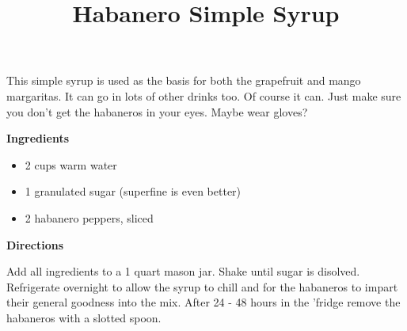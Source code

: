 \documentclass{article}
\title{Habanero Simple Syrup}
\begin{document}
This simple syrup is used as the basis for both the grapefruit and mango margaritas. It can go in
lots of other drinks too. Of course it can. Just make sure you don't get the habaneros in your
eyes. Maybe wear gloves?

\textbf{Ingredients}

\begin{itemize}
      \item 2 cups warm water
      \item 1 granulated sugar (superfine is even better)
      \item 2 habanero peppers, sliced
\end{itemize}

\textbf{Directions}


Add all ingredients to a 1 quart mason jar. Shake until sugar is disolved. Refrigerate
overnight to allow the syrup to chill and for the habaneros to impart their general
goodness into the mix. After 24 - 48 hours in the 'fridge remove the habaneros with a
slotted spoon.

\end{document}
